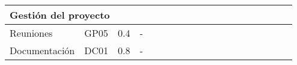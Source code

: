 \begin{table}[H]
\begin{tabular}{|llcllllllllllllllll|}
        \multicolumn{4}{|l|}{\textbf{Gestión del proyecto}}                                                                                                                                                                                                                                                                        & \multicolumn{15}{l|}{}                                                                                                                                                                                                                                                                                                                                                                                                                                                                                               \\ \hline
        \multicolumn{1}{|l|}{Reuniones}                                                                                         & \multicolumn{1}{l|}{GP05}                              & \multicolumn{1}{c|}{0.4}                                 & \multicolumn{1}{l|}{-}                                                       &                                 &                                 &                                 & \cellcolor[HTML]{EF8787}        &                                 &                                 &                                 &                                 &                                 &                                 &                                 &                                 &                                 & \cellcolor[HTML]{EF8787}        &                          \\ \cline{1-4}
        \multicolumn{1}{|l|}{Documentación}                                                                                     & \multicolumn{1}{l|}{DC01}                              & \multicolumn{1}{c|}{0.8}                                 & \multicolumn{1}{l|}{-}                                                       &                                 &                                 &                                 &                                 & \cellcolor[HTML]{C9C9C9}        & \cellcolor[HTML]{C9C9C9}        & \cellcolor[HTML]{C9C9C9}        & \cellcolor[HTML]{FFFFFF}        &                                 &                                 &                                 &                                 &                                 &                                 & \cellcolor[HTML]{C9C9C9} \\ \hline

\end{tabular}
\end{table}
